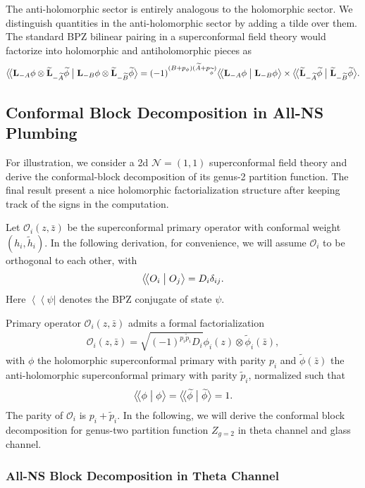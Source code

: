 \documentclass[12pt]{article}
\newcommand{\ie}{\begin{equation}\begin{aligned}}
\newcommand{\fe}{\end{aligned}\end{equation}}
\numberwithin{equation}{section}
\newcommand{\bpzbraket}[2]{%
  \bigl\langle\!\bigl\langle #1 \bigm| #2 \bigr\rangle%
}
\begin{document}
The anti-holomorphic sector is entirely analogous to the holomorphic sector. We distinguish quantities in the anti-holomorphic sector by adding a tilde over them.
The standard BPZ bilinear pairing in a superconformal field theory would factorize into holomorphic and antiholomorphic pieces as
\ie
\bpzbraket{ \mathbf{L}_{-A} \phi  \otimes \widetilde{\mathbf{L}}_{-\widetilde{A}} \widetilde{\phi} }{ \mathbf{L}_{-B} \phi \otimes  \widetilde{\mathbf{L}}_{-\widetilde{B}} \widetilde{\phi}} =(-1)^{(B+p_{\phi})(\widetilde{A}+p_{\widetilde{\phi}})}\bpzbraket{\mathbf{L}_{-A} \phi}{\mathbf{L}_{-B} \phi } \times \bpzbraket{ \widetilde{\mathbf{L}}_{-\widetilde{A} }\widetilde{\phi}}{ \widetilde{\mathbf{L}}_{-\widetilde{B}}\widetilde{\phi}}.
\fe


\subsection{Conformal Block Decomposition in All-NS Plumbing}

For illustration, we consider a 2d \(\mathcal N=(1,1)\) superconformal field theory and derive the conformal-block decomposition of its genus-2 partition function. The final result present a nice holomorphic factorialization structure after keeping track of the signs in the computation.

Let $\mathcal{O}_i(z,\bar{z})$ be the superconformal primary operator with conformal weight $(h_i,\tilde{h}_i)$. In the following derivation, for convenience, we will assume $\mathcal{O}_i$ to be orthogonal to each other, with
\ie
 \bpzbraket{O_i }{O_j} =D_i \delta_{ij}.
\fe
Here $\left\langle\!\left\langle \psi \big| \right.\right.$ denotes the BPZ conjugate of state $\psi$. 

Primary operator $\mathcal{O}_i(z,\bar{z})$ admits a formal factorialization 
\ie
\mathcal{O}_i(z,\bar{z}) = \sqrt{(-1)^{p_i \tilde{p}_i}D_i} \phi_i (z)\otimes \widetilde \phi_i(\bar{z}),
\fe
with $\phi$ the holomorphic superconformal primary with parity $p_i$ and  $\widetilde \phi(\bar{z})$ the anti-holomorphic superconformal primary with parity $\tilde{p}_i$, normalized such that 
\ie
\bpzbraket{\phi }{\phi} =\bpzbraket{\widetilde{\phi} }{\widetilde \phi} =1.
\fe
The parity of $\mathcal{O}_i$ is $p_i+\tilde{p}_i$. In the following, we will derive the conformal block decomposition for genus-two partition function \(Z_{g=2}\) in theta channel and glass channel. 

\subsubsection*{All-NS Block Decomposition in Theta Channel}
\end{document}
